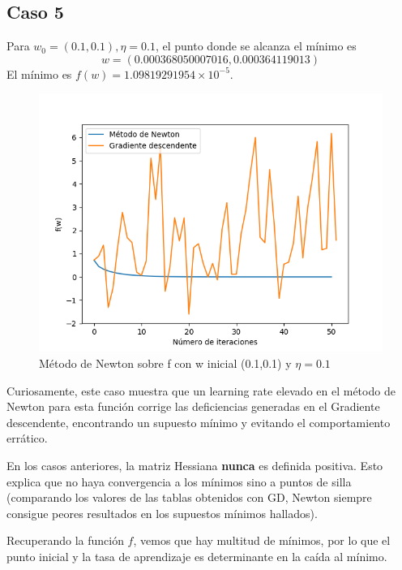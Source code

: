 \subsection{Caso 5}

Para $w_0=(0.1,0.1), \eta = 0.1$, el punto donde se alcanza el mínimo es $$w=(0.000368050007016 , 0.000364119013)$$ El mínimo es $f(w) = 1.09819291954\times 10^{-5}$.

\begin{figure}[H] %
	\centering
	\includegraphics[scale=0.6]{bonus5.png}  %
	\caption{Método de Newton sobre f con w inicial (0.1,0.1) y $\eta = 0.1$} 
	\label{fig:bon5}
\end{figure}

Curiosamente, este caso muestra que un learning rate elevado en el método de Newton para esta función corrige las deficiencias generadas en el Gradiente descendente, encontrando un supuesto mínimo y evitando el comportamiento errático.

En los casos anteriores, la matriz Hessiana \textbf{nunca} es definida positiva. Esto explica que no haya convergencia a los mínimos sino a puntos de silla (comparando los valores de las tablas obtenidos con GD, Newton siempre consigue peores resultados en los supuestos mínimos hallados).


Recuperando la función $f$, vemos que hay multitud de mínimos, por lo que el punto inicial y la tasa de aprendizaje es determinante en la caída al mínimo.

